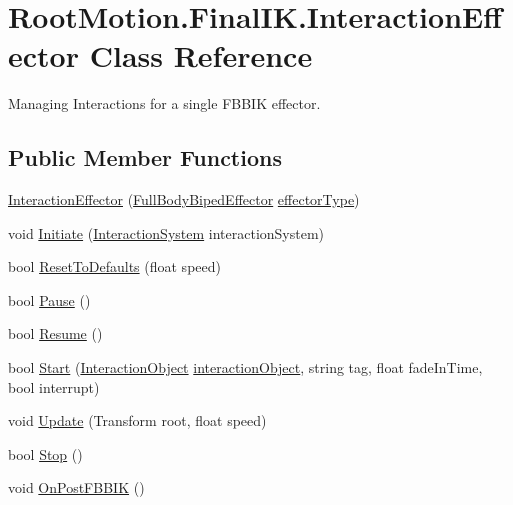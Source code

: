 \hypertarget{class_root_motion_1_1_final_i_k_1_1_interaction_effector}{}\section{Root\+Motion.\+Final\+I\+K.\+Interaction\+Effector Class Reference}
\label{class_root_motion_1_1_final_i_k_1_1_interaction_effector}


Managing Interactions for a single F\+B\+B\+IK effector.  


\subsection*{Public Member Functions}
\begin{DoxyCompactItemize}
\item 
\mbox{\hyperlink{class_root_motion_1_1_final_i_k_1_1_interaction_effector_ab3dd1265142860d8ec5db881b8a34aa8}{Interaction\+Effector}} (\mbox{\hyperlink{namespace_root_motion_1_1_final_i_k_ae0dd2058c7667b6f132c11a6b860c14a}{Full\+Body\+Biped\+Effector}} \mbox{\hyperlink{class_root_motion_1_1_final_i_k_1_1_interaction_effector_a7c98593a91ed1e12f940f3ab1a5e9c9c}{effector\+Type}})
\item 
void \mbox{\hyperlink{class_root_motion_1_1_final_i_k_1_1_interaction_effector_ade0431085297e409476a5319837df14d}{Initiate}} (\mbox{\hyperlink{class_root_motion_1_1_final_i_k_1_1_interaction_system}{Interaction\+System}} interaction\+System)
\item 
bool \mbox{\hyperlink{class_root_motion_1_1_final_i_k_1_1_interaction_effector_a3c7c8c7e5c481e68ebfd6b3ed21209a4}{Reset\+To\+Defaults}} (float speed)
\item 
bool \mbox{\hyperlink{class_root_motion_1_1_final_i_k_1_1_interaction_effector_afa54e633915c39be4d153d023123b8ca}{Pause}} ()
\item 
bool \mbox{\hyperlink{class_root_motion_1_1_final_i_k_1_1_interaction_effector_a474e0c3490add3ab446305df0ee8ce1f}{Resume}} ()
\item 
bool \mbox{\hyperlink{class_root_motion_1_1_final_i_k_1_1_interaction_effector_a7ec2ff0c84091865de67d02a2901cc21}{Start}} (\mbox{\hyperlink{class_root_motion_1_1_final_i_k_1_1_interaction_object}{Interaction\+Object}} \mbox{\hyperlink{class_root_motion_1_1_final_i_k_1_1_interaction_effector_a5c48995c4290262ffcde75ff24dbd84d}{interaction\+Object}}, string tag, float fade\+In\+Time, bool interrupt)
\item 
void \mbox{\hyperlink{class_root_motion_1_1_final_i_k_1_1_interaction_effector_a6222d7ba53f1a48fe0f38544dbabeb64}{Update}} (Transform root, float speed)
\item 
bool \mbox{\hyperlink{class_root_motion_1_1_final_i_k_1_1_interaction_effector_a4c00b7caf633a35b43fc9651d327cbef}{Stop}} ()
\item 
void \mbox{\hyperlink{class_root_motion_1_1_final_i_k_1_1_interaction_effector_a5b5222ee077d98311c7193d34fe420d4}{On\+Post\+F\+B\+B\+IK}} ()
\end{DoxyCompactItemize}
